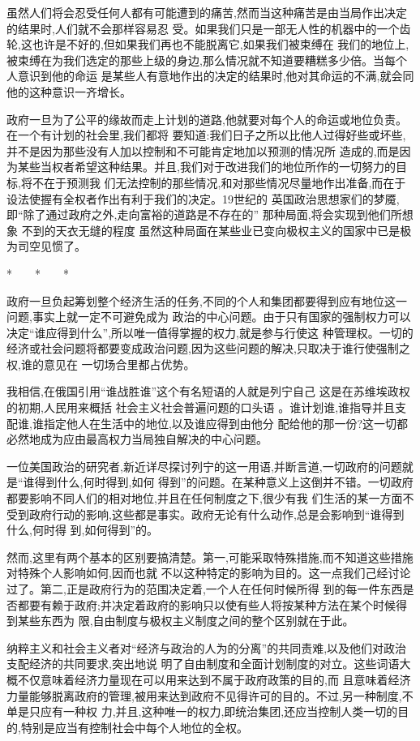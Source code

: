 ﻿\documentclass[12pt]{article}
\begin{document}
虽然人们将会忍受任何人都有可能遭到的痛苦,然而当这种痛苦是由当局作出决定的结果时,人们就不会那样容易忍
受。如果我们只是一部无人性的机器中的一个齿轮,这也许是不好的,但如果我们再也不能脱离它,如果我们被束缚在
我们的地位上,被束缚在为我们选定的那些上级的身边,那么情况就不知道要糟糕多少倍。当每个人意识到他的命运
是某些人有意地作出的决定的结果时,他对其命运的不满,就会同他的这种意识一齐增长。

政府一旦为了公平的缘故而走上计划的道路,他就要对每个人的命运或地位负责。在一个有计划的社会里,我们都将
要知道:我们日子之所以比他人过得好些或坏些,并不是因为那些没有人加以控制和不可能肯定地加以预测的情况所
造成的,而是因为某些当权者希望这种结果。并且,我们对于改进我们的地位所作的一切努力的目标,将不在于预测我
们无法控制的那些情况,和对那些情况尽量地作出准备,而在于设法使握有全权者作出有利于我们的决定。19世纪的
英国政治思想家们的梦魇,即``除了通过政府之外,走向富裕的道路是不存在的'' 那种局面,将会实现到他们所想象
不到的天衣无缝的程度 \myrule 虽然这种局面在某些业已变向极权主义的国家中已是极为司空见惯了。

*　　*　　*

政府一旦负起筹划整个经济生活的任务,不同的个人和集团都要得到应有地位这一问题,事实上就一定不可避免成为
政治的中心问题。由于只有国家的强制权力可以决定``谁应得到什么'',所以唯一值得掌握的权力,就是参与行使这
种管理权。一切的经济或社会问题将都要变成政治问题,因为这些问题的解决,只取决于谁行使强制之权,谁的意见在
一切场合里都占优势。

我相信,在俄国引用``谁战胜谁''这个有名短语的人就是列宁自己 \myrule 这是在苏维埃政权的初期,人民用来概括
社会主义社会普遍问题的口头语 。谁计划谁,谁指导并且支配谁,谁指定他人在生活中的地位,以及谁应得到由他分
配给他的那一份?这一切都必然地成为应由最高权力当局独自解决的中心问题。

一位美国政治的研究者,新近详尽探讨列宁的这一用语,并断言道,一切政府的问题就是``谁得到什么,何时得到,如何
得到''的问题。在某种意义上这倒并不错。一切政府都要影响不同人们的相对地位,并且在任何制度之下,很少有我
们生活的某一方面不受到政府行动的影响,这些都是事实。政府无论有什么动作,总是会影响到``谁得到什么,何时得
到,如何得到''的。

然而,这里有两个基本的区别要搞清楚。第一,可能采取特殊措施,而不知道这些措施对特殊个人影响如何,因而也就
不以这种特定的影响为目的。这一点我们己经讨论过了。第二,正是政府行为的范围决定着,一个人在任何时候所得
到的每一件东西是否都要有赖于政府;并决定着政府的影响只以使有些人将按某种方法在某个时候得到某些东西为
限,自由制度与极权主义制度之间的整个区别就在于此。

纳粹主义和社会主义者对``经济与政治的人为的分离''的共同责难,以及他们对政治支配经济的共同要求,突出地说
明了自由制度和全面计划制度的对立。这些词语大概不仅意味着经济力量现在可以用来达到不属于政府政策的目的,而
且意味着经济力量能够脱离政府的管理,被用来达到政府不见得许可的目的。不过,另一种制度,不单是只应有一种权
力,并且,这种唯一的权力,即统治集团,还应当控制人类一切的目的,特别是应当有控制社会中每个人地位的全权。
\end{document}
